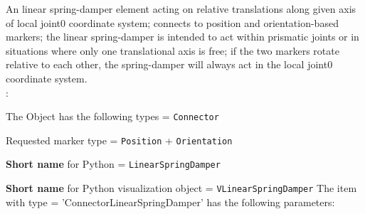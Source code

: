 \ei

%
\newpage


\label{sec:item:ObjectConnectorLinearSpringDamper}
An linear spring-damper element acting on relative translations along given axis of local joint0 coordinate system; connects to position and orientation-based markers; the linear spring-damper is intended to act within prismatic joints or in situations where only one translational axis is free; if the two markers rotate relative to each other, the spring-damper will always act in the local joint0 coordinate system.
\vspace{12pt}\\

\noindent {}:
\bi
  \item The Object has the following types = \texttt{Connector}
  \item Requested marker type = \texttt{Position} + \texttt{Orientation}
  \item {\bf Short name} for Python = \texttt{LinearSpringDamper}
  \item {\bf Short name} for Python visualization object = \texttt{VLinearSpringDamper}
\ei\vspace{12pt} \noindent 
The item  with type = 'ConnectorLinearSpringDamper' has the following parameters:
\vspace{-0.5cm}\\
\vspace{-0.5cm}\\
